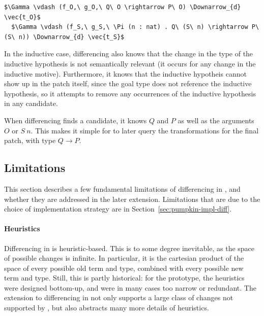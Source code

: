 \begin{lstlisting}[language=coq]
  $\Gamma \vdash (f_O,\ g_O,\ Q\ O \rightarrow P\ O) \Downarrow_{d} \vec{t_O}$
  $\Gamma \vdash (f_S,\ g_S,\ \Pi (n : nat) . Q\ (S\ n) \rightarrow P\ (S\ n)) \Downarrow_{d} \vec{t_S}$
\end{lstlisting}
In the inductive case, differencing also knows that the change in the type of the inductive hypothesis is not semantically relevant (it occurs for any change in the inductive motive).
Furthermore, it knows that the inductive hypotheis cannot show up in the patch itself, since the goal type does not reference the inductive hypothesis,
so it attempts to remove any occurrences of the inductive hypothesis in any candidate.

When differencing finds a candidate, it knows $Q$ and $P$ as well as the arguments $O$ or $S\ n$.
This makes it simple for \sysname to later query the transformations for the final patch, with type $Q \rightarrow P$.

\subsection{Limitations}
\label{sec:pumpkin-diff-limitations}


This section describes a few fundamental limitations of differencing in \sysname,
and whether they are addressed in the later \toolnamec extension.
Limitations that are due to the choice of implementation strategy are in Section~\ref{sec:pumpkin-impl-diff}.

\paragraph{Heuristics}
Differencing in \sysname is heuristic-based.
This is to some degree inevitable, as the space of possible changes is infinite.
In particular, it is the cartesian product of the space of every possible old term and type,
combined with every possible new term and type.
Still, this is partly historical: for the \sysname prototype, the heuristics were designed bottom-up, and were in many cases too narrow or redundant.
The extension to differencing in \toolnamec not only supports a large class of changes not supported by \sysname,
but also abstracts many more details of heuristics.

